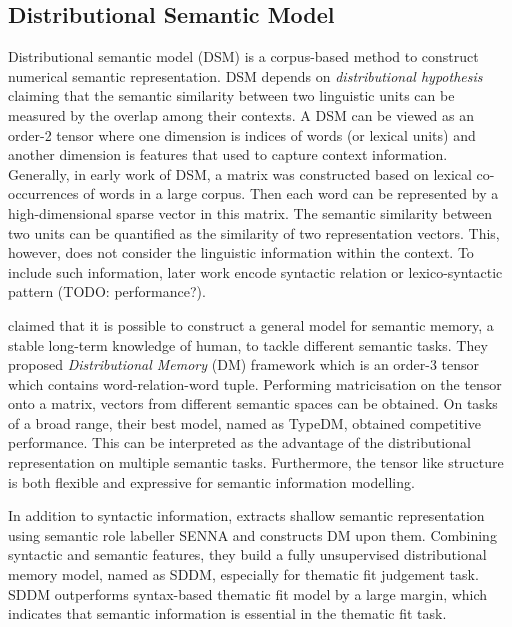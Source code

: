 \documentclass[a4paper]{article}
\begin{document}
\subsection{Distributional Semantic Model} \label{sec:dsm}
Distributional semantic model (DSM) is a corpus-based method to construct numerical semantic representation. DSM depends on \textit{distributional hypothesis} \citep{harris1954distributional, miller1991contextual} claiming that the semantic similarity between two linguistic units can be measured by the overlap among their contexts. A DSM can be viewed as an order-2 tensor where one dimension is indices of words (or lexical units) and another dimension is features that used to capture context information. Generally, in early work of DSM, a matrix was constructed based on lexical co-occurrences of words in a large corpus. Then each word can be represented by a high-dimensional sparse vector in this matrix. The semantic similarity between two units can be quantified as the similarity of two representation vectors. This, however, does not consider the linguistic information within the context. To include such information, later work encode syntactic relation or lexico-syntactic pattern \citep{pado2007integration, erk2008structured, rothenhausler2009unsupervised} (TODO: performance?). 

\citet{baroni2010distributional} claimed that it is possible to construct a general model for semantic memory, a stable long-term knowledge of human, to tackle different semantic tasks. They proposed \textit{Distributional Memory} (DM) framework which is an order-3 tensor which contains word-relation-word tuple. Performing matricisation on the tensor onto a matrix, vectors from different semantic spaces can be obtained. On tasks of a broad range, their best model, named as TypeDM, obtained competitive performance. This can be interpreted as the advantage of the distributional representation on multiple semantic tasks. Furthermore, the tensor like structure is both flexible and expressive for semantic information modelling. 

In addition to syntactic information, \citet{sayeed2014combining} extracts shallow semantic representation using semantic role labeller SENNA and constructs DM upon them. Combining syntactic and semantic features, they build a fully unsupervised distributional memory model, named as SDDM, especially for thematic fit judgement task. SDDM outperforms syntax-based thematic fit model by a large margin, which indicates that semantic information is essential in the thematic fit task. 
\end{document}
